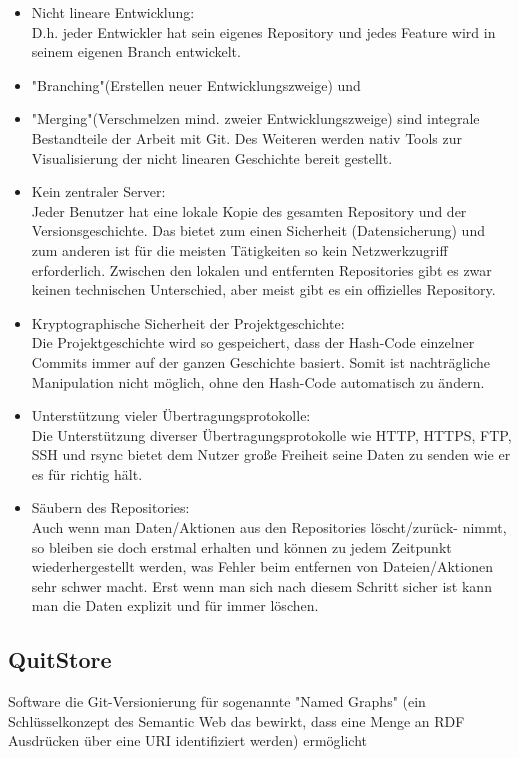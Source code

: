        \begin{itemize}
            \item Nicht lineare Entwicklung:\\
            D.h. jeder Entwickler hat sein eigenes Repository und jedes Feature
            wird in seinem eigenen Branch entwickelt.
            \item "Branching"(Erstellen neuer Entwicklungszweige) und
            \item "Merging"(Verschmelzen mind. zweier Entwicklungszweige) sind 
            integrale Bestandteile der Arbeit mit Git. Des Weiteren werden nativ Tools 
            zur Visualisierung der nicht linearen Geschichte bereit gestellt.
            \item Kein zentraler Server:\\
            Jeder Benutzer hat eine lokale Kopie des gesamten Repository und der 
            Versionsgeschichte. Das bietet zum einen Sicherheit (Datensicherung) und 
            zum anderen ist für die meisten Tätigkeiten so kein Netzwerkzugriff 
            erforderlich. Zwischen den lokalen und entfernten Repositories gibt es 
            zwar keinen technischen Unterschied, aber meist gibt es ein offizielles 
            Repository.
            \item Kryptographische Sicherheit der Projektgeschichte:\\
            Die Projektgeschichte wird so gespeichert, dass der Hash-Code einzelner 
            Commits immer auf der ganzen Geschichte basiert. Somit ist
            nachträgliche Manipulation nicht möglich, ohne den Hash-Code automatisch 
            zu ändern.
            \item Unterstützung vieler Übertragungsprotokolle:\\
            Die Unterstützung diverser Übertragungsprotokolle wie HTTP, HTTPS, FTP, 
            SSH und rsync bietet dem Nutzer große Freiheit seine Daten zu
            senden wie er es für richtig hält.
            \item Säubern des Repositories:\\
            Auch wenn man Daten/Aktionen aus den Repositories löscht/zurück-
            nimmt, so bleiben sie doch erstmal erhalten und können zu jedem Zeitpunkt 
            wiederhergestellt werden, was Fehler beim entfernen von Dateien/Aktionen 
            sehr schwer macht. Erst wenn man sich nach diesem Schritt sicher ist kann 
            man die Daten explizit und für immer löschen.
        \end{itemize}
    
    \subsection{QuitStore}
    Software die Git-Versionierung für sogenannte "Named Graphs" (ein Schlüsselkonzept 
    des Semantic Web das bewirkt, dass eine Menge an RDF Ausdrücken über eine URI 
    identifiziert werden) ermöglicht

